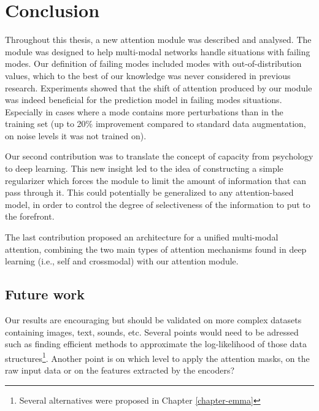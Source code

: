 \chapter{Conclusion} 
\label{chapter-conclusion} 

Throughout this thesis, a new attention module was described and analysed. The module was designed to help multi-modal networks handle situations with failing modes. Our definition of failing modes included modes with out-of-distribution values, which to the best of our knowledge was never considered in previous research. Experiments showed that the shift of attention produced by our module was indeed beneficial for the prediction model in failing modes situations. Especially in cases where a mode contains more perturbations than in the training set (up to 20\% improvement compared to standard data augmentation, on noise levels it was not trained on).

Our second contribution was to translate the concept of capacity from psychology to deep learning. This new insight led to the idea of constructing a simple regularizer which forces the module to limit the amount of information that can pass through it. This could potentially be generalized to any attention-based model, in order to control the degree of selectiveness of the information to put to the forefront.

The last contribution proposed an architecture for a unified multi-modal attention, combining the two main types of attention mechanisms found in deep learning (i.e., self and crossmodal) with our attention module.


\section{Future work}

Our results are encouraging but should be validated on more complex datasets containing images, text, sounds, etc. Several points would need to be adressed such as finding efficient methods to approximate the log-likelihood of those data structures\footnote{Several alternatives were proposed in Chapter \ref{chapter-emma}}. Another point is on which level to apply the attention masks, on the raw input data or on the features extracted by the encoders?

